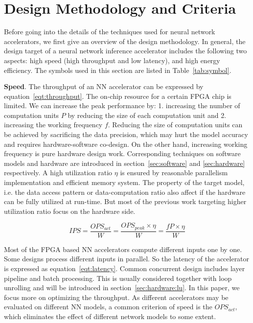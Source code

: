 \section{Design Methodology and Criteria}\label{sec:design_method}

Before going into the details of the techniques used for neural network accelerators, we first give an overview of the design methodology. In general, the design target of a neural network inference accelerator includes the following two aspects: high speed (high throughput and low latency), and high energy efficiency. The symbols used in this section are listed in Table~\ref{tab:symbol}.




\textbf{Speed}. The throughput of an NN accelerator can be expressed by equation~\ref{eqt:throughput}. The on-chip resource for a certain FPGA chip is limited. We can increase the peak performance by: 1. increasing the number of computation units $P$ by reducing the size of each computation unit and 2. increasing the working frequency $f$. Reducing the size of computation units can be achieved by sacrificing the data precision, which may hurt the model accuracy and requires hardware-software co-design. On the other hand, increasing working frequency is pure hardware design work. Corresponding techniques on software models and hardware are introduced in section~\ref{sec:software} and \ref{sec:hardware} respectively. A high utilization ratio $\eta$ is ensured by reasonable parallelism implementation and efficient memory system. The property of the target model, i.e. the data access pattern or data-computation ratio also affect if the hardware can be fully utilized at run-time. But most of the previous work targeting higher utilization ratio focus on the hardware side.

\begin{equation}\label{eqt:throughput}
    IPS = \frac{OPS_{act}}{W} = \frac{OPS_{peak} \times \eta}{W} = \frac{fP\times\eta}{W}
\end{equation}

Most of the FPGA based NN accelerators compute different inputs one by one. Some designs process different inputs in parallel. So the latency of the accelerator is expressed as equation~\ref{eqt:latency}. Common concurrent design includes layer pipeline and batch processing. This is usually considered together with loop unrolling and will be introduced in section~\ref{sec:hardware:lu}. In this paper, we focus more on optimizing the throughput. As different accelerators may be evaluated on different NN models, a common criterion of speed is the $OPS_{act}$, which eliminates the effect of different network models to some extent.

